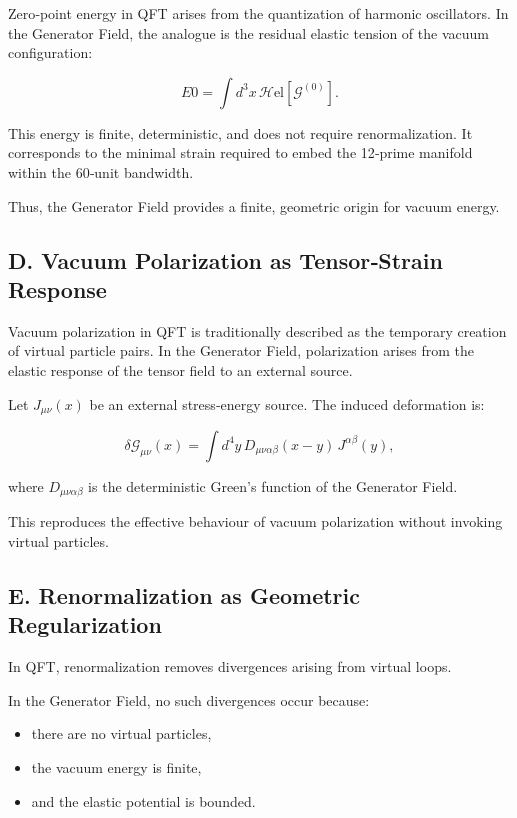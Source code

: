 \documentclass[reprint,amsmath,amssymb,aps,prl,floatfix]{revtex4-2}
\begin{document}
Zero‑point energy in QFT arises from the quantization of harmonic oscillators. In the Generator Field, the analogue is the residual elastic tension of the vacuum configuration:

\[
E0 = \int d^3x\,\mathcal{H}{\mathrm{el}}[\mathcal{G}^{(0)}].
\]
\medskip

This energy is finite, deterministic, and does not require renormalization.  
It corresponds to the minimal strain required to embed the 12‑prime manifold within the 60‑unit bandwidth.
\medskip

Thus, the Generator Field provides a finite, geometric origin for vacuum energy.

\subsection{D. Vacuum Polarization as Tensor‑Strain Response}

Vacuum polarization in QFT is traditionally described as the temporary creation of virtual particle pairs. In the Generator Field, polarization arises from the elastic response of the tensor field to an external source.
\medskip

Let \(J_{\mu\nu}(x)\) be an external stress‑energy source. The induced deformation is:

\[
\delta\mathcal{G}_{\mu\nu}(x)
=
\int d^4y\,D_{\mu\nu\alpha\beta}(x-y)\,J^{\alpha\beta}(y),
\]
\medskip

where \(D_{\mu\nu\alpha\beta}\) is the deterministic Green’s function of the Generator Field.
\medskip

This reproduces the effective behaviour of vacuum polarization without invoking virtual particles.

\subsection{E. Renormalization as Geometric Regularization}

In QFT, renormalization removes divergences arising from virtual loops.  
\medskip

In the Generator Field, no such divergences occur because:
\begin{itemize}
\item there are no virtual particles,  
\item the vacuum energy is finite,  
\item and the elastic potential is bounded.
\end{itemize}
\end{document}
